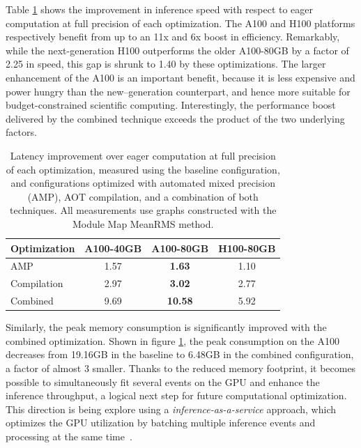 Table \ref{tab:gnn-comp-improve} shows the improvement in inference speed with respect to eager computation at full precision of each optimization. 
The A100 and H100 platforms respectively benefit from up to an 11x and 6x boost in efficiency. 
Remarkably, while the next-generation H100 outperforms the older A100-80GB by a factor of 2.25 in speed, this gap is shrunk to 1.40 by these optimizations. 
The larger enhancement of the A100 is an important benefit, because it is less expensive and power hungry than the new--generation counterpart, and hence more suitable for budget-constrained scientific computing. 
Interestingly, the performance boost delivered by the combined technique exceeds the product of the two underlying factors. 

\begin{table}[h!]
    \centering
    \begin{tabular}{|l|c|c|c|} \hline
        Optimization & {A100-40GB} & {A100-80GB} & {H100-80GB} \\ \hline\hline
        AMP & 1.57 & \textbf{1.63} & 1.10 \\
        Compilation & 2.97 & \textbf{3.02} & 2.77 \\
        Combined & 9.69 & \textbf{10.58} & 5.92 \\ \hline
    \end{tabular}
    \caption{Latency improvement over eager computation at full precision of each optimization, measured using the baseline configuration, and configurations optimized with automated mixed precision (AMP), AOT compilation, and a combination of both techniques. All measurements use graphs constructed with the Module Map MeanRMS method.}
    \label{tab:gnn-comp-improve}
\end{table}

Similarly, the peak memory consumption is significantly improved with the combined optimization.
Shown in figure \ref{tab:gnn-comp-improve}, the peak consumption on the A100 decreases from 19.16GB in the baseline to 6.48GB in the combined configuration, a factor of almost 3 smaller. 
Thanks to the reduced memory footprint, it becomes possible to simultaneously fit several events on the GPU and enhance the inference throughput, a logical next step for future computational optimization.
This direction is being explore using a \textit{inference-as-a-service} approach, which optimizes the GPU utilization by batching multiple inference events and processing
at the same time~\cite{zhao2025trackreconstructionservicecollider}. 

